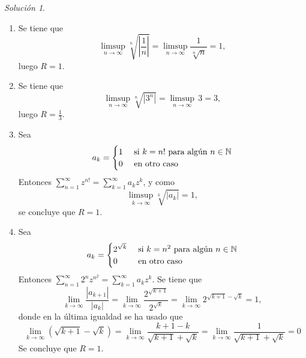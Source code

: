 \documentclass[11pt]{report}
\newcommand{\N}{\mathbb N}
\newcommand{\serie}[2][0]{\sum_{n=#1}^\infty #2}
\theoremstyle{remark}
\newtheorem*{resolution}{Solución}
\begin{document}
\begin{resolution}
\hfill
\begin{enumerate}
    \item Se tiene que
    \[\limsup_{n \to \infty} \sqrt[n]{\left|\frac{1}{n}\right|} = \limsup_{n \to \infty} \frac{1}{\sqrt[n]{n}} = 1,\]
    luego $R = 1$.
    \item Se tiene que
    \[\limsup_{n \to \infty} \sqrt[n]{|3^n|} = \limsup_{n \to \infty} \, 3 = 3,\]
    luego $R = \frac{1}{3}$.
    \item Sea
    \[a_k = \begin{cases}
        1 & $ si $ k = n! $ para algún $ n \in \N \\
        0 & $ en otro caso$
    \end{cases}\]
    Entonces $\serie[1]{z^{n!}} = \sum_{k=1}^\infty a_kz^k$, y como
    \[\limsup_{k \to \infty} \sqrt[k]{|a_k|} = 1,\]
    se concluye que $R = 1$.
    \item Sea
    \[a_k = \begin{cases}
        2^{\sqrt{k}} & $ si $ k = n^2 $ para algún $ n \in \N \\
        0 & $ en otro caso$
    \end{cases}\]
    Entonces $\serie[1]{2^nz^{n^2}} = \sum_{k=1}^\infty a_kz^k$. Se tiene que
    \[\lim_{k \to \infty} \frac{|a_{k+1}|}{|a_k|} = \lim_{k \to \infty} \frac{2^{\sqrt{k+1}}}{2^{\sqrt{k}}} = \lim_{k \to \infty}2^{\sqrt{k+1}-\sqrt{k}} = 1,\]
    donde en la última igualdad se ha usado que
    \[\lim_{k \to \infty}(\sqrt{k+1}-\sqrt{k}) = \lim_{k \to \infty} \frac{k+1-k}{\sqrt{k+1}+\sqrt{k}} = \lim_{k \to \infty} \frac{1}{\sqrt{k+1}+\sqrt{k}} = 0\]
    Se concluye que $R = 1$.


\end{enumerate}
\end{resolution}
\end{document}
